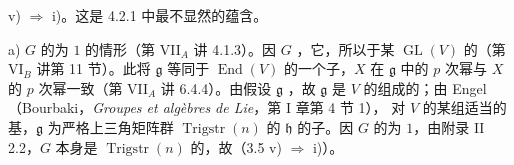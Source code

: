 v) $\Rightarrow$ i)。这是 4.2.1 中最不显然的蕴含。

a) $G$ 的为 $1$ 的情形（第 VII$_A$ 讲 4.1.3）。因 $G$ ，它，所以于某 $\operatorname{GL}(V)$ 的（第 VI$_B$ 讲第 11 节）。此将 $\mathfrak g$ 等同于 $\operatorname{End}(V)$ 的一个子，$X$ 在 $\mathfrak g$ 中的 $p$ 次幂与 $X$ 的 $p$ 次幂一致（第 VII$_A$ 讲 6.4.4）。由假设 $\mathfrak g$ ，故 $\mathfrak g$ 是 $V$ 的组成的；由 Engel （Bourbaki，\textit{Groupes et algèbres de Lie}，第 I 章第 4 节 1），
对 $V$ 的某组适当的基，$\mathfrak g$ 为严格上三角矩阵群 $\operatorname{Trigstr}(n)$ 的 $\mathfrak h$ 的子。因 $G$ 的为 $1$，由附录 II 2.2，$G$ 本身是 $\operatorname{Trigstr}(n)$ 的，故（3.5 v) $\Rightarrow$ i)）。

